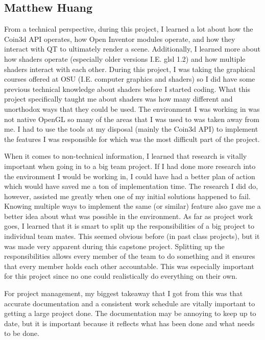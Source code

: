 \documentclass[10pt,journal,compsoc,draftclsnofoot]{IEEEtran}
\begin{document}
\begin{flushleft}
\subsection{Matthew Huang}
From a technical perspective, during this project, I learned a lot about how the Coin3d API operates, how Open Inventor modules operate, and how they interact with QT to ultimately render a scene.
Additionally, I learned more about how shaders operate (especially older versions I.E. glsl 1.2) and how multiple shaders interact with each other.
During this project, I was taking the graphical courses offered at OSU (I.E. computer graphics and shaders) so I did have some previous technical knowledge about shaders before I started coding.
What this project specifically taught me about shaders was how many different and unorthodox ways that they could be used.
The environment I was working in was not native OpenGL so many of the areas that I was used to was taken away from me.
I had to use the tools at my disposal (mainly the Coin3d API) to implement the features I was responsible for which was the most difficult part of the project.\par
\vspace{3mm}
When it comes to non-technical information, I learned that research is vitally important when going in to a big team project.
If I had done more research into the environment I would be working in, I could have had a better plan of action which would have saved me a ton of implementation time.
The research I did do, however, assisted me greatly when one of my initial solutions happened to fail.
Knowing multiple ways to implement the same (or similar) feature also gave me a better idea about what was possible in the environment.
As far as project work goes, I learned that it is smart to split up the responsibilities of a big project to individual team mates.
This seemed obvious before (in past class projects), but it was made very apparent during this capstone project.
Splitting up the responsibilities allows every member of the team to do something and it ensures that every member holds each other accountable.
This was especially important for this project since no one could realistically do everything on their own. \par
\vspace{3mm}
For project management, my biggest takeaway that I got from this was that accurate documentation and a consistent work schedule are vitally important to getting a large project done.
The documentation may be annoying to keep up to date, but it is important because it reflects what has been done and what needs to be done.

\end{flushleft}
\end{document}
